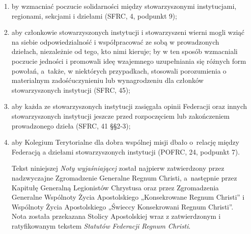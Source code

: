 \begin{enumerate}
\begin{enumerate}
\item by wzmacniać poczucie solidarności między stowarzyszonymi instytucjami, regionami, sekcjami i dziełami (SFRC, 4, podpunkt 9);


\item aby członkowie stowarzyszonych instytucji i stowarzyszeni wierni mogli wziąć na siebie odpowiedzialność i współpracować ze sobą w prowadzonych dziełach, niezależnie od tego, kto nimi kieruje; by w ten sposób wzmacniali poczucie jedności i promowali ideę wzajemnego uzupełniania się różnych form powołań, \mbox{a także}, w niektórych przypadkach, stosowali porozumienia o materialnym zadośćuczynieniu lub wynagrodzeniu dla członków stowarzyszonych instytucji (SFRC, 45);


\item aby każda ze stowarzyszonych instytucji zasięgała opinii Federacji oraz innych stowarzyszonych instytucji jeszcze przed rozpoczęciem lub zakończeniem prowadzonego dzieła (SFRC, 41 \S{}\S{}2-3);


\item aby Kolegium Terytorialne dla dobra wspólnej misji dbało \mbox{o relację} między Federacją a dziełami stowarzyszonych instytucji (POFRC, 24, podpunkt 7).
 
Tekst niniejszej {\em Noty wyjaśniającej} został najpierw zatwierdzony przez nadzwyczajne Zgromadzenie Generalne Regnum Christi, \mbox{a następnie} przez Kapitułę Generalną Legionistów Chrystusa oraz przez Zgromadzenia Generalne Wspólnoty Życia Apostolskiego „Konsekrowane Regnum Christi” i Wspólnoty Życia Apostolskiego „Świeccy Konsekrowani Regnum Christi”. Nota została przekazana Stolicy Apostolskiej wraz z zatwierdzonym i ratyfikowanym tekstem {\em Statutów Federacji Regnum Christi}.


\end{enumerate}


\end{enumerate}